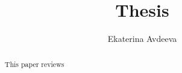 \documentclass{article}
\begin{document}
 
\pagenumbering{}
\title{\textbf{Thesis}}

\author{Ekaterina Avdeeva}

\maketitle

\begin{abstract}
This paper reviews
\end{abstract}




\pagestyle{fancy}
\fancyhf{}
\lhead[]{\thepage}
\rhead[\thepage]{}

\tableofcontents

%




%




%
%
%

%
%

%
%
%

%
%
%
%
%
%
%


\end{document}
